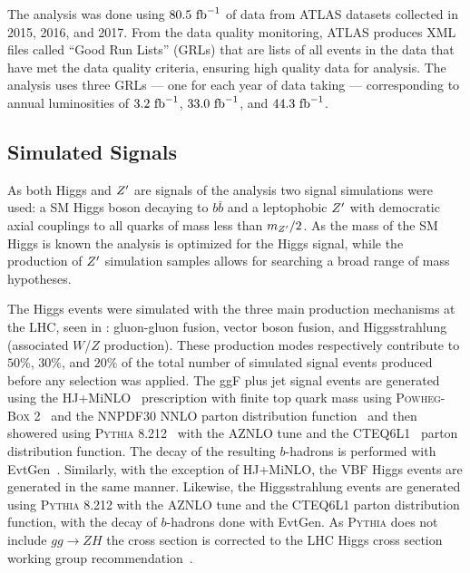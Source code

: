 The analysis was done using $80.5~\mathrm{fb}^{-1}$ of data from ATLAS datasets collected in 2015, 2016, and 2017.
From the data quality monitoring, ATLAS produces XML files called ``Good Run Lists'' (GRLs) that are lists of all events in the data that have met the data quality criteria, ensuring high quality data for analysis.
The analysis uses three GRLs --- one for each year of data taking --- corresponding to annual luminosities of $3.2~\mathrm{fb}^{-1}$, $33.0~\mathrm{fb}^{-1}$, and $44.3~\mathrm{fb}^{-1}$.

\subsection{Simulated Signals}\label{sec:simulation_signal}

As both Higgs and $Z^{\prime}$ are signals of the analysis two signal simulations were used: a SM Higgs boson decaying to $b\bar{b}$ and a leptophobic $Z^{\prime}$ with democratic axial couplings to all quarks of mass less than $m_{Z^{\prime}}/2$.
As the mass of the SM Higgs is known the analysis is optimized for the Higgs signal, while the production of $Z^{\prime}$ simulation samples allows for searching a broad range of mass hypotheses.

The Higgs events were simulated with the three main production mechanisms at the LHC, seen in : gluon-gluon fusion, vector boson fusion, and Higgsstrahlung (associated $W$/$Z$ production).
These production modes respectively contribute to $50\%$, $30\%$, and $20\%$ of the total number of simulated signal events produced before any selection was applied.
The ggF plus jet signal events are generated using the HJ+MiNLO~\cite{Hamilton:2015nsa} prescription with finite top quark mass using \textsc{Powheg-Box} 2~\cite{Campbell:2012am} and the NNPDF30 NNLO parton distribution function~\cite{Hamilton:2012rf} and then showered using \textsc{Pythia} 8.212~\cite{Sjostrand:2014zea} with the AZNLO tune and the CTEQ6L1~\cite{Pumplin:2002vw} parton distribution function.
The decay of the resulting $b$-hadrons is performed with EvtGen~\cite{Lange:2001uf}.
Similarly, with the exception of HJ+MiNLO, the VBF Higgs events are generated in the same manner.
Likewise, the Higgsstrahlung events are generated using \textsc{Pythia} 8.212 with the AZNLO tune and the CTEQ6L1 parton distribution function, with the decay of $b$-hadrons done with EvtGen.
As \textsc{Pythia} does not include $gg \to ZH$ the cross section is corrected to the LHC Higgs cross section working group recommendation~\cite{MelladoGarcia:2150771}.


